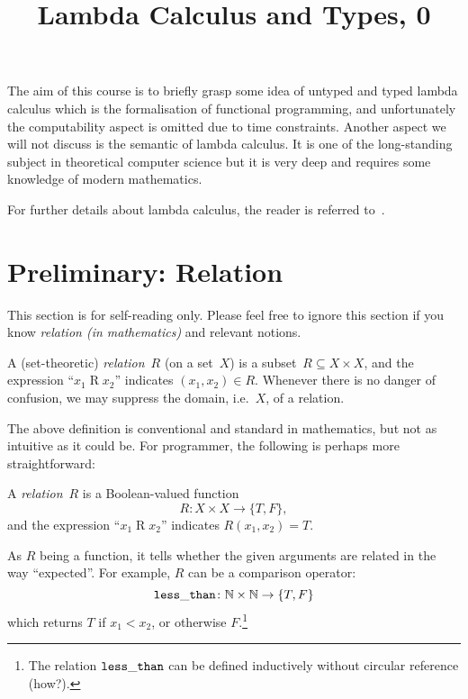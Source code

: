 \title{Lambda Calculus and Types, 0}

\begin{frame}
\maketitle
\end{frame}

The aim of this course is to briefly grasp some idea of untyped and typed lambda
calculus which is the formalisation of functional programming, and unfortunately
the computability aspect is omitted due to time constraints. Another aspect we
will not discuss is the semantic of lambda calculus. It is one of the
long-standing subject in theoretical computer science but it is very deep
and requires some knowledge of modern mathematics. 

For further details about lambda calculus, the reader is referred
to~\cite{Barendregt1984,Barendregt1992,Barendregt1984a}. 

\section{Preliminary: Relation}
This section is for self-reading only. Please feel free to ignore this section
if you know \emph{relation (in mathematics)} and relevant notions.

\begin{definition}
  A (set-theoretic) \emph{relation}~$R$ (on a set~$X$) is a subset~$R
  \subseteq X \times X$, and the expression ``$x_1 \mathbin{R} x_2$'' indicates
  $(x_1, x_2) \in R$.  Whenever there is no danger of confusion, we may suppress
  the domain, i.e.\ $X$, of a relation. 
\end{definition}

The above definition is conventional and standard in mathematics, but not as
intuitive as it could be. For programmer, the following is perhaps more
straightforward:
\begin{definition}[Functional]
  A \emph{relation}~$R$ is a Boolean-valued function 
  \[
    R\colon X \times X \to \{T, F\},
  \]
  and the expression ``$x_1 \mathbin{R} x_2$'' indicates $R(x_1, x_2) = T$.
\end{definition}

As $R$ being a function, it tells whether the given arguments are related in the
way ``expected''. For example, $R$ can be a comparison operator:
\[
  {\tt less\_than}\colon \mathbb{N} \times \mathbb{N} \to \{T, F\}
\]
which returns $T$ if $x_1 < x_2$, or otherwise $F$.\footnote{%
  The relation ${\tt less\_than}$ can be defined inductively without circular
  reference (how?).}

